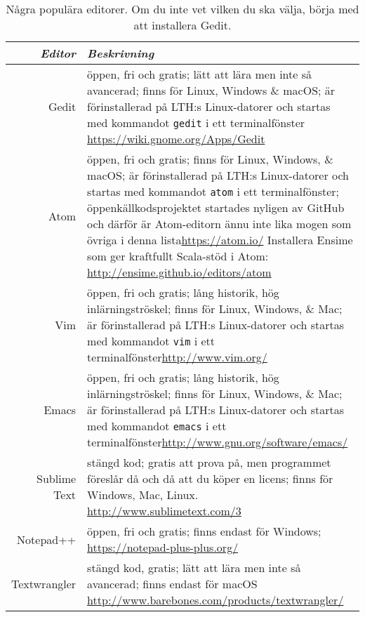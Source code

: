 \begin{table}[t]

\renewcommand{\arraystretch}{1.25}

\begin{tabular}{@{}r | p{}}
\textit{Editor} & \textit{Beskrivning} \\ \hline

Gedit & öppen, fri och gratis; lätt att lära men inte så avancerad; finns för Linux, Windows \& macOS; är förinstallerad på LTH:s Linux-datorer och startas med kommandot \verb+gedit+ i ett terminalfönster\newline  
 \url{https://wiki.gnome.org/Apps/Gedit} \\

Atom & öppen, fri och gratis; finns för Linux, Windows, \& macOS; är förinstallerad på LTH:s Linux-datorer och startas med kommandot \verb+atom+ i ett terminalfönster; öppenkällkodsprojektet startades nyligen av GitHub och därför är Atom-editorn ännu inte lika mogen som övriga i denna lista\newline \url{https://atom.io/} \newline 
Installera Ensime som ger kraftfullt Scala-stöd i Atom: \newline \url{http://ensime.github.io/editors/atom}\\


Vim & öppen, fri och gratis; lång historik, hög inlärningströskel; finns för Linux, Windows, \& Mac; är förinstallerad på LTH:s Linux-datorer och startas med kommandot \verb+vim+ i ett terminalfönster\newline \url{http://www.vim.org/} \\

Emacs & öppen, fri och gratis; lång historik, hög inlärningströskel; finns för Linux, Windows, \& Mac; är förinstallerad på LTH:s Linux-datorer och startas med kommandot \verb+emacs+ i ett terminalfönster\newline \url{http://www.gnu.org/software/emacs/} \\

Sublime Text& stängd kod; gratis att prova på, men programmet föreslår då och då att du köper en licens; finns för Windows, Mac, Linux. \newline
 \url{http://www.sublimetext.com/3} \\


Notepad++ & öppen, fri och gratis; finns endast för Windows; \newline \url{https://notepad-plus-plus.org/} \\


Textwrangler & stängd kod, gratis; lätt att lära men inte så avancerad; finns endast för macOS  
\newline \url{http://www.barebones.com/products/textwrangler/} \\

\end{tabular}
    \caption{Några populära editorer. Om du inte vet vilken du ska välja, börja med att installera Gedit.}
    \label{edit:popular-editors}
\end{table}